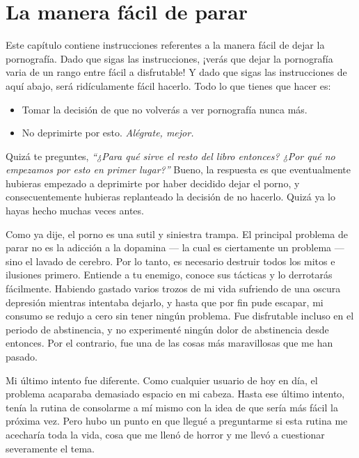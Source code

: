 \documentclass[
  spanish,
  openany]{book}
\providecommand{\tightlist}{%
  \setlength{\itemsep}{0pt}\setlength{\parskip}{0pt}}
\begin{document}
\hypertarget{la-manera-facil-de-parar}{%
\chapter{La manera fácil de parar}\label{la-manera-facil-de-parar}}

Este capítulo contiene instrucciones referentes a la manera fácil de dejar la pornografía. Dado que sigas las instrucciones, ¡verás que dejar la pornografía varia de un rango entre fácil a disfrutable! Y dado que sigas las instrucciones de aquí abajo, será ridículamente fácil hacerlo. Todo lo que tienes que hacer es:

\begin{itemize}
\tightlist
\item
  Tomar la decisión de que no volverás a ver pornografía nunca más.
\item
  No deprimirte por esto. \emph{Alégrate, mejor.}
\end{itemize}

Quizá te preguntes, \emph{``¿Para qué sirve el resto del libro entonces? ¿Por qué no empezamos por esto en primer lugar?''} Bueno, la respuesta es que eventualmente hubieras empezado a deprimirte por haber decidido dejar el porno, y consecuentemente hubieras replanteado la decisión de no hacerlo. Quizá ya lo hayas hecho muchas veces antes.

Como ya dije, el porno es una sutil y siniestra trampa. El principal problema de parar no es la adicción a la dopamina --- la cual es ciertamente un problema --- sino el lavado de cerebro. Por lo tanto, es necesario destruir todos los mitos e ilusiones primero. Entiende a tu enemigo, conoce sus tácticas y lo derrotarás fácilmente. Habiendo gastado varios trozos de mi vida sufriendo de una oscura depresión mientras intentaba dejarlo, y hasta que por fin pude escapar, mi consumo se redujo a cero sin tener ningún problema. Fue disfrutable incluso en el periodo de abstinencia, y no experimenté ningún dolor de abstinencia desde entonces. Por el contrario, fue una de las cosas más maravillosas que me han pasado.

Mi último intento fue diferente. Como cualquier usuario de hoy en día, el problema acaparaba demasiado espacio en mi cabeza. Hasta ese último intento, tenía la rutina de consolarme a mí mismo con la idea de que sería más fácil la próxima vez. Pero hubo un punto en que llegué a preguntarme si esta rutina me acecharía toda la vida, cosa que me llenó de horror y me llevó a cuestionar severamente el tema.
\end{document}
